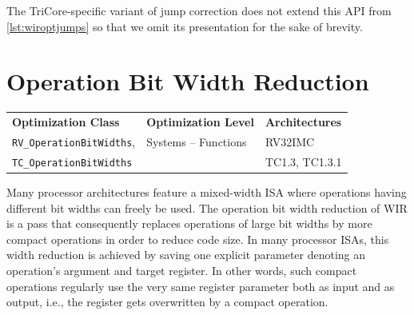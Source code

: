 The TriCore-specific variant of jump correction does not extend this \gls{API} from \cref{lst:wiroptjumps} so that we omit its presentation for the sake of brevity.


\section{Operation Bit Width Reduction}
\label{sec:optopwidth}

\begin{tabular}{|l|l|l|}
  \hline
  \textbf{Optimization Class} & \textbf{Optimization Level} & \textbf{Architectures} \\
  \hhline{|=|=|=|}
  \texttt{RV\_OperationBitWidths}, & Systems -- Functions & RV32IMC \\
  \texttt{TC\_OperationBitWidths} & & TC1.3, TC1.3.1 \\
  \hline
\end{tabular}

Many processor architectures feature a mixed-width \gls{ISA} where operations having different bit widths can freely be used.
The operation bit width reduction of \gls{WIR} is a pass that consequently replaces operations of large bit widths by more compact operations in order to reduce code size.
In many processor \glspl{ISA}, this width reduction is achieved by saving one explicit parameter denoting an operation's argument and target register.
In other words, such compact operations regularly use the very same register parameter both as input and as output, i.e., the register gets overwritten by a compact operation.

